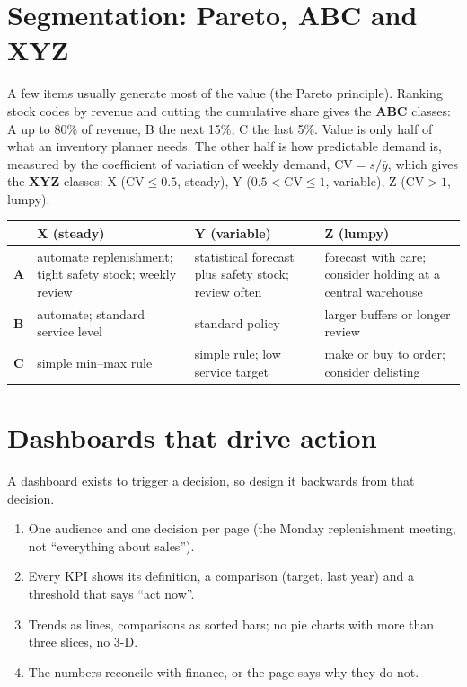 \section{Segmentation: Pareto, ABC and XYZ}
A few items usually generate most of the value (the Pareto principle). Ranking stock codes by revenue and cutting the
cumulative share gives the \textbf{ABC} classes: A up to 80\% of revenue, B the next 15\%, C the last 5\%.
Value is only half of what an inventory planner needs. The other half is how predictable demand is, measured by the
coefficient of variation of weekly demand, $\mathrm{CV}=s/\bar y$, which gives the \textbf{XYZ} classes:
X ($\mathrm{CV}\le0.5$, steady), Y ($0.5<\mathrm{CV}\le1$, variable), Z ($\mathrm{CV}>1$, lumpy).

\begin{center}\small
\begin{tabularx}{\linewidth}{@{}l Y Y Y@{}}
\toprule
 & \textbf{X (steady)} & \textbf{Y (variable)} & \textbf{Z (lumpy)}\\\midrule
\textbf{A} & automate replenishment; tight safety stock; weekly review & statistical forecast plus safety stock; review often & forecast with care; consider holding at a central warehouse\\
\textbf{B} & automate; standard service level & standard policy & larger buffers or longer review\\
\textbf{C} & simple min--max rule & simple rule; low service target & make or buy to order; consider delisting\\\bottomrule
\end{tabularx}
\end{center}

\section{Dashboards that drive action}
A dashboard exists to trigger a decision, so design it backwards from that decision.
\begin{enumerate}[nosep]
\item One audience and one decision per page (the Monday replenishment meeting, not ``everything about sales'').
\item Every KPI shows its definition, a comparison (target, last year) and a threshold that says ``act now''.
\item Trends as lines, comparisons as sorted bars; no pie charts with more than three slices, no 3-D.
\item The numbers reconcile with finance, or the page says why they do not.
\end{enumerate}
